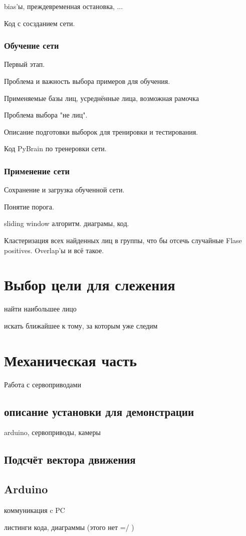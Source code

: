 \documentclass[12pt]{report}
\begin{document}
bias'ы, преждевременная остановка, ...

Код с сосзданием сети.
\subsubsection{Обучение сети}
Первый этап.

Проблема и важность выбора примеров для обучения.

Применяемые базы лиц, усреднённые лица, возможная рамочка

Проблема выбора "не лиц".

Описание подготовки выборок для тренировки и тестирования.

Код PyBrain по тренеровки сети.
\subsubsection{Применение сети}
Сохранение и загрузка обученной сети.

Понятие порога.

sliding window алгоритм. диаграмы, код.

Кластеризация всех найденных лиц в группы, что бы отсечь случайные Flase positives. Overlap'ы и всё такое.
\section{Выбор цели для слежения}
найти наибольшее лицо

искать ближайшее к тому, за которым уже следим
\section{Механическая часть}
Работа с сервоприводами
\subsection{описание установки для демонстрации}
arduino,
сервоприводы,
камеры
\subsection{Подсчёт вектора движения}
\subsection{Arduino}
коммуникация c PC

листинги кода, диаграммы (этого нет =/ )
\end{document}
